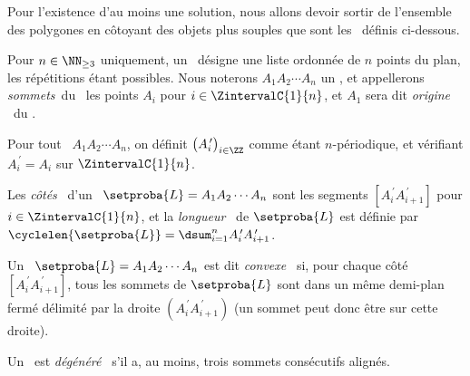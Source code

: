 Pour l'existence d'au moins une solution, nous allons devoir sortir de l'ensemble des polygones en côtoyant des objets plus souples que sont les \ncycles\ définis ci-dessous.




\begin{defi}
	Pour $n \in \NN_{\geq3}$ uniquement, un \og \emph{\ncycle} \fg\ désigne une liste ordonnée de $n$ points du plan, les répétitions étant possibles.
	Nous noterons $A_1 A_2 \cdots A_n$ un \ncycle, 
	et appellerons 
	\og \emph{sommets}\fg\ du \ncycle\ les points $A_i$ pour $i \in \ZintervalC{1}{n}$,
	et $A_1$ sera dit \og \emph{origine} \fg\ du \ncycle.
\end{defi}


\begin{defi}
    Pour tout \ncycle\ $A_1 A_2 \cdots A_n$, on définit $\big( A^{\,\prime}_i \big)_{i \in \ZZ}$ comme étant $n$-périodique, et vérifiant $A^{\,\prime}_{i} = A_i$ sur $\ZintervalC{1}{n}$.
\end{defi}


\begin{defi}
	Les \og \emph{côtés} \fg\ d'un \ncycle\ $\setproba{L} = A_1 A_2 \cdots A_n$ sont les segments
	$[A^{\,\prime}_i A^{\,\prime}_{i+1}]$ pour $i \in \ZintervalC{1}{n}$,
	et
	la \og \emph{longueur} \fg\ de $\setproba{L}$ est définie par $\cyclelen{\setproba{L}} = \dsum_{i=1}^{n} A^{\,\prime}_i A^{\,\prime}_{i+1}$.
\end{defi}


\begin{defi}
	Un \ncycle\ $\setproba{L} = A_1 A_2 \cdots A_n$ est dit \og \emph{convexe} \fg\ si, pour chaque côté $[A^{\,\prime}_i A^{\,\prime}_{i+1}]$, tous les sommets de $\setproba{L}$ sont dans un même demi-plan fermé délimité par la droite $(A^{\,\prime}_i A^{\,\prime}_{i+1})$ (un sommet peut donc être sur cette droite).
\end{defi}


\begin{defi}
	Un \ncycle\ est \og \emph{dégénéré} \fg\ s'il a, au moins, trois sommets consécutifs alignés.
\end{defi}


